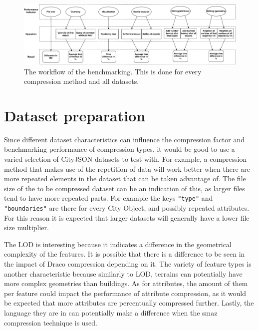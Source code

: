\begin{landscape}\centering
\thispagestyle{empty} %
\begin{figure}[htbp]

    \hspace*{-2.8cm}  
    \includegraphics[scale=0.83]{figs/methodology/benchmarking.pdf}
    \caption{The workflow of the benchmarking. This is done for every compression method and all datasets.}
    \label{fig:benchmarking}
\end{figure}
\end{landscape}


\section{Dataset preparation}
\label{methdataset}

Since different dataset characteristics can influence the compression factor and benchmarking performance of compression types, it would be good to use a varied selection of CityJSON datasets to test with.
For example, a compression method that makes use of the repetition of data will work better when there are more repeated elements in the dataset that can be taken advantage of.
The file size of the to be compressed dataset can be an indication of this, as larger files tend to have more repeated parts. 
For example the keys \texttt{"type"} and \texttt{"boundaries"} are there for every City Object, and possibly repeated attributes.
For this reason it is expected that larger datasets will generally have a lower file size multiplier.

The LOD is interesting because it indicates a difference in the geometrical complexity of the features.
It is possible that there is a difference to be seen in the impact of Draco compression depending on it.
The variety of feature types is another characteristic because similarly to LOD, terrains can potentially have more complex geometries than buildings.
As for attributes, the amount of them per feature could impact the performance of attribute compression, as it would be expected that more attributes are percentually compressed further.
Lastly, the language they are in can potentially make a difference when the smaz compression technique is used.

